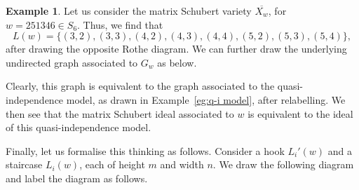\documentclass[11pt]{amsart}
\theoremstyle{definition}
\newtheorem{example}[theorem]{Example}
\theoremstyle{definition}
\theoremstyle{definition}
\theoremstyle{definition}
\newcommand{\Xw}{\overline{X_w}}
\begin{document}
\begin{example}
    Let us consider the matrix Schubert variety $\Xw$, for $w = 251346 \in S_6$. Thus, we find that 
    $$L(w) = \{(3,2),(3,3),(4,2),(4,3),(4,4),(5,2),(5,3),(5,4)\},$$
    after drawing the opposite Rothe diagram. We can further draw the underlying undirected graph associated to $G_w$ as below.

    \begin{center}
\end{center}
 \noindent Clearly, this graph is equivalent to the graph associated to the quasi-independence model, as drawn in Example~\ref{eg:q-i model}, after relabelling. We then see that the matrix Schubert ideal associated to $w$ is equivalent to the ideal of this quasi-independence model. 
\end{example}


\noindent
Finally, let us formalise this thinking as follows. Consider a hook $L_i'(w)$ and a staircase $L_i(w)$, each of height $m$ and width $n$. We draw the following diagram and label the diagram as follows. 
\end{document}
